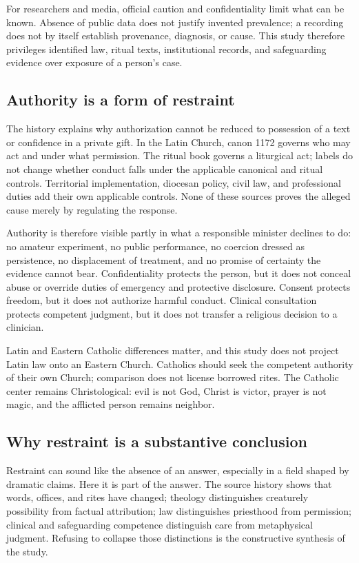 For researchers and media, official caution and confidentiality limit what can
be known.
Absence of public data does not justify invented prevalence; a recording does
not by itself establish provenance, diagnosis, or cause. This study therefore
privileges identified law, ritual texts, institutional records, and
safeguarding evidence over exposure of a person's case.

\subsection{Authority is a form of restraint}

The history explains why authorization cannot be reduced to possession of a
text or confidence in a private gift. In the Latin Church, canon 1172 governs
who may act and under what permission. The ritual book governs a liturgical
act; labels do not change whether conduct falls under the applicable canonical
and ritual controls. Territorial implementation, diocesan policy, civil law,
and professional duties add their own applicable controls. None of these
sources proves the alleged cause merely by regulating the response.

Authority is therefore visible partly in what a responsible minister declines
to do: no amateur experiment, no public performance, no coercion dressed as
persistence, no displacement of treatment, and no promise of certainty the
evidence cannot bear. Confidentiality protects the person, but it does not
conceal abuse or override duties of emergency and protective disclosure.
Consent protects freedom, but it does not authorize harmful conduct. Clinical
consultation protects competent judgment, but it does not transfer a religious
decision to a clinician.

Latin and Eastern Catholic differences matter, and this study does not project
Latin law onto an Eastern Church. Catholics should seek the competent authority
of their own Church; comparison does not license borrowed rites. The Catholic
center remains Christological: evil is not God, Christ is victor, prayer is not
magic, and the afflicted person remains neighbor.

\subsection{Why restraint is a substantive conclusion}

Restraint can sound like the absence of an answer, especially in a field shaped
by dramatic claims. Here it is part of the answer. The source history shows
that words, offices, and rites have changed; theology distinguishes creaturely
possibility from factual attribution; law distinguishes priesthood from
permission; clinical and safeguarding competence distinguish care from
metaphysical judgment. Refusing to collapse those distinctions is the
constructive synthesis of the study.

